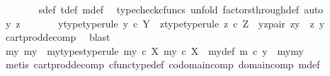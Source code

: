 \begin{isabellebody}
\ \ \ \ \ \ \isamarkupfalse%
\ s{\isacharunderscore}{\kern0pt}def\ t{\isacharunderscore}{\kern0pt}def\ m{\isacharunderscore}{\kern0pt}def\ \isamarkupfalse%
\ {\isacharparenleft}{\kern0pt}typecheck{\isacharunderscore}{\kern0pt}cfuncs{\isacharcomma}{\kern0pt}\ unfold\ factors{\isacharunderscore}{\kern0pt}through{\isacharunderscore}{\kern0pt}def{}{\isacharcomma}{\kern0pt}\ auto{\isacharparenright}{\kern0pt}\isanewline
\ \ \ \ \isamarkupfalse%
\ \isamarkupfalse%
\ y\ z\ \isanewline
\ \ \ \ \ \ y{\isacharunderscore}{\kern0pt}type{\isacharbrackleft}{\kern0pt}type{\isacharunderscore}{\kern0pt}rule{\isacharbrackright}{\kern0pt}{\isacharcolon}{\kern0pt}\ {\isachardoublequoteopen}y\ {\isasymin}\isactrlsub c\ Y{\isachardoublequoteclose}\ \ z{\isacharunderscore}{\kern0pt}type{\isacharbrackleft}{\kern0pt}type{\isacharunderscore}{\kern0pt}rule{\isacharbrackright}{\kern0pt}{\isacharcolon}{\kern0pt}\ {\isachardoublequoteopen}z\ {\isasymin}\isactrlsub c\ Z{\isachardoublequoteclose}\ \ yz{\isacharunderscore}{\kern0pt}pair{\isacharcolon}{\kern0pt}\ {\isachardoublequoteopen}zy\ {\isacharequal}{\kern0pt}\ {\isasymlangle}z{\isacharcomma}{\kern0pt}\ y{\isasymrangle}{\isachardoublequoteclose}\isanewline
\ \ \ \ \ \ \isamarkupfalse%
\ cart{\isacharunderscore}{\kern0pt}prod{\isacharunderscore}{\kern0pt}decomp\ \isamarkupfalse%
\ blast\isanewline
\ \ \ \ \isamarkupfalse%
\ \isamarkupfalse%
\ my{}\ my{}\ \ my{\isacharunderscore}{\kern0pt}types{\isacharbrackleft}{\kern0pt}type{\isacharunderscore}{\kern0pt}rule{\isacharbrackright}{\kern0pt}{\isacharcolon}{\kern0pt}\ {\isachardoublequoteopen}my{}\ {\isasymin}\isactrlsub c\ X{\isachardoublequoteclose}\ {\isachardoublequoteopen}my{}\ {\isasymin}\isactrlsub c\ X{\isachardoublequoteclose}\ \ my{\isacharunderscore}{\kern0pt}def{\isacharcolon}{\kern0pt}\ {\isachardoublequoteopen}m\ {\isasymcirc}\isactrlsub c\ y\ {\isacharequal}{\kern0pt}\ {\isasymlangle}my{}{\isacharcomma}{\kern0pt}my{}{\isasymrangle}{\isachardoublequoteclose}\isanewline
\ \ \ \ \ \ \isamarkupfalse%
\ {\isacharparenleft}{\kern0pt}metis\ cart{\isacharunderscore}{\kern0pt}prod{\isacharunderscore}{\kern0pt}decomp\ cfunc{\isacharunderscore}{\kern0pt}type{\isacharunderscore}{\kern0pt}def\ codomain{\isacharunderscore}{\kern0pt}comp\ domain{\isacharunderscore}{\kern0pt}comp\ m{\isacharunderscore}{\kern0pt}def{\isacharparenleft}{\kern0pt}{}{\isacharparenright}{\kern0pt}{\isacharparenright}{\kern0pt}\isanewline

\end{isabellebody}
